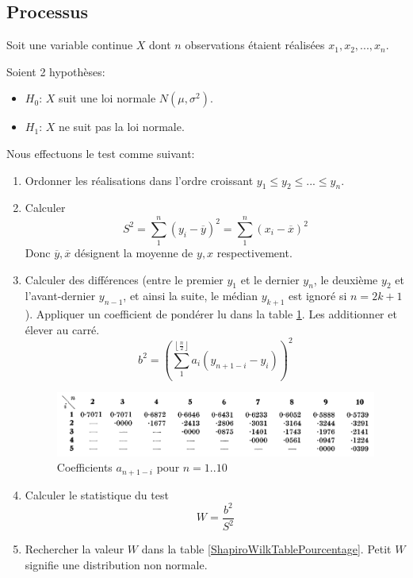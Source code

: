 \documentclass[12pt,a4paper]{article}
\begin{document}
\subsection{Processus}

Soit une variable continue $X$ dont $n$ observations étaient réalisées $x_1, x_2, ..., x_n$.

Soient 2 hypothèses: 
\begin{itemize}
\item $H_0$: $X$ suit une loi normale $N(\mu, \sigma^2)$.
\item $H_1$: $X$ ne suit pas la loi normale.
\end{itemize}

Nous effectuons le test comme suivant:
\begin{enumerate}
\item Ordonner les réalisations dans l'ordre croissant $y_1 \leq y_2 \leq ... \leq y_n$.
\item Calculer \[{S^2} = \sum\limits_1^n {{{\left( {{y_i} - \overline y } \right)}^2}}  = \sum\limits_1^n {{{\left( {{x_i} - \overline x } \right)}^2}} \]
Donc $\overline y, \overline x$ désignent la moyenne de $y, x$ respectivement.
\item Calculer des différences (entre le premier $y_1$ et le dernier $y_n$, le deuxième $y_2$ et l'avant-dernier $y_{n-1}$, et ainsi la suite, le médian $y_{k+1}$ est ignoré si $n=2k+1$). Appliquer un coefficient de pondérer lu dans la table \ref{ShapiroWilkTablePonderer}. Les additionner et élever au carré.
\[{b^2} = {\left( {\sum\limits_1^{\left\lfloor {\frac{n}{2}} \right\rfloor } {{a_i}\left( {{y_{n + 1 - i}} - {y_i}} \right)} } \right)^2}\]
\begin{figure}[!h]
\centering
\includegraphics[width=\textwidth]{images/ShapiroWilk_N_1_10.png}
\caption{Coefficients $a_{n+1-i}$ pour $n=1..10$}
\label{ShapiroWilkTablePonderer}
\end{figure}
\item Calculer le statistique du test \[W = \frac{{{b^2}}}{{{S^2}}}\]
\item Rechercher la valeur $W$ dans la table \ref{ShapiroWilkTablePourcentage}. Petit $W$ signifie une distribution non normale.
\begin{figure}[!h]

\end{figure}
\end{enumerate}
\end{document}
